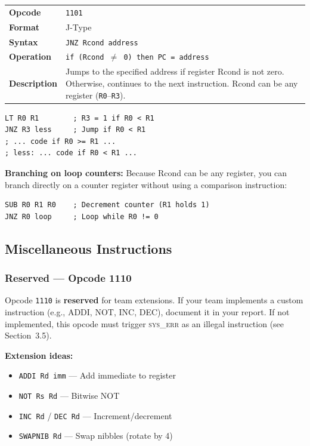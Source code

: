 \documentclass[11pt,a4paper]{article}
\newcommand{\reg}[1]{\texttt{R#1}}
\newcommand{\opcode}[1]{\texttt{#1}}
\newcommand{\signal}[1]{\textsc{#1}}
\begin{document}
\begin{table}[H]
\begin{tabularx}{\textwidth}{@{}lX@{}}
\toprule
\textbf{Opcode}      & \opcode{1101} \\
\textbf{Format}      & J-Type \\
\textbf{Syntax}      & \lstinline|JNZ Rcond address| \\
\textbf{Operation}   & \texttt{if (Rcond $\neq$ 0) then PC = address} \\
\textbf{Description} & Jumps to the specified address if register Rcond is not zero. Otherwise, continues to the next instruction. Rcond can be any register (\reg{0}--\reg{3}). \\
\bottomrule
\end{tabularx}
\end{table}

\begin{lstlisting}
LT R0 R1        ; R3 = 1 if R0 < R1
JNZ R3 less     ; Jump if R0 < R1
; ... code if R0 >= R1 ...
; less: ... code if R0 < R1 ...
\end{lstlisting}

\textbf{Branching on loop counters:} Because Rcond can be any register, you can branch directly on a counter register without using a comparison instruction:
\begin{lstlisting}
SUB R0 R1 R0    ; Decrement counter (R1 holds 1)
JNZ R0 loop     ; Loop while R0 != 0
\end{lstlisting}

\subsection{Miscellaneous Instructions}

\subsubsection{Reserved --- Opcode 1110}

Opcode \texttt{1110} is \textbf{reserved} for team extensions. If your team implements a custom instruction (e.g., ADDI, NOT, INC, DEC), document it in your report. If not implemented, this opcode must trigger \signal{sys\_err} as an illegal instruction (see Section~3.5).

\textbf{Extension ideas:}
\begin{itemize}[nosep]
  \item \lstinline|ADDI Rd imm| --- Add immediate to register
  \item \lstinline|NOT Rs Rd| --- Bitwise NOT
  \item \lstinline|INC Rd| / \lstinline|DEC Rd| --- Increment/decrement
  \item \lstinline|SWAPNIB Rd| --- Swap nibbles (rotate by 4)
\end{itemize}
\end{document}
